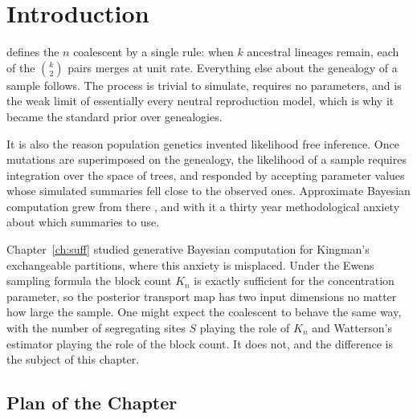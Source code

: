 
\section{Introduction}\label{coal:sec:intro}

\citet{coal:kingman1982} defines the $n$ coalescent by a single rule: when $k$ ancestral lineages remain, each of the $\binom{k}{2}$ pairs merges at unit rate. Everything else about the genealogy of a sample follows. The process is trivial to simulate, requires no parameters, and is the weak limit of essentially every neutral reproduction model, which is why it became the standard prior over genealogies.

It is also the reason population genetics invented likelihood free inference. Once mutations are superimposed on the genealogy, the likelihood of a sample requires integration over the space of trees, and \citet{coal:tavare1997} responded by accepting parameter values whose simulated summaries fell close to the observed ones. Approximate Bayesian computation grew from there \citep{coal:beaumont2002}, and with it a thirty year methodological anxiety about which summaries to use.

Chapter~\ref{ch:suff} studied generative Bayesian computation \citep{coal:polson2024} for Kingman's exchangeable partitions, where this anxiety is misplaced. Under the Ewens sampling formula the block count $K_n$ is exactly sufficient for the concentration parameter, so the posterior transport map has two input dimensions no matter how large the sample. One might expect the coalescent to behave the same way, with the number of segregating sites $S$ playing the role of $K_n$ and Watterson's estimator playing the role of the block count. It does not, and the difference is the subject of this chapter.

\subsection{Plan of the Chapter}\label{coal:sec:contrib}

